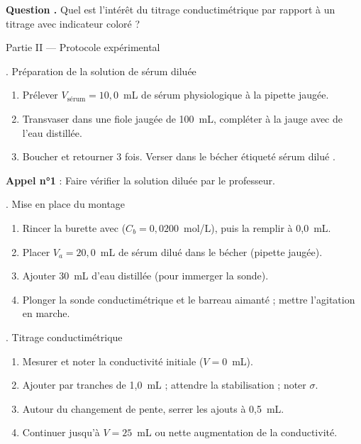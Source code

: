 \documentclass[11pt,a4paper]{article}
\newcommand{\sectitle}[1]{%
  \vspace{6pt}
  \noindent\colorbox{exoheader}{\parbox{\dimexpr\linewidth-2\fboxsep}%
    {\color{white}\bfseries\large\strut\quad #1}}
  \vspace{4pt}
}
\newcommand{\subsectitle}[1]{%
  \vspace{4pt}
  \noindent\colorbox{exolight}{\parbox{\dimexpr\linewidth-2\fboxsep}%
    {\color{exoheader}\bfseries\strut\quad #1}}
  \vspace{2pt}
}
\newcounter{question}
\newcommand{\question}{%
  \stepcounter{question}%
  \noindent\textcolor{exoheader}{\textbf{Question \thequestion.}}\quad
}
\begin{document}
\vspace{0.3cm}\noindent\dotfill

\question Quel est l'intérêt du titrage conductimétrique par rapport à un titrage avec indicateur coloré ? \dotfill

\vspace{0.3cm}\noindent\dotfill

\sectitle{Partie II --- Protocole expérimental}

\subsectitle{1. Préparation de la solution de sérum diluée}

\begin{enumerate}[leftmargin=1.5cm, label=\textcolor{exoheader}{\textbf{\arabic*.}}]
  \item Prélever $V_{\text{sérum}} = 10{,}0$~mL de sérum physiologique à la pipette jaugée.
  \item Transvaser dans une fiole jaugée de 100~mL, compléter à la jauge avec de l'eau distillée.
  \item Boucher et retourner 3 fois. Verser dans le bécher étiqueté \og sérum dilué \fg{}.
\end{enumerate}

\noindent\textcolor{exoheader}{\faCheckSquare\quad \textbf{Appel n°1} : Faire vérifier la solution diluée par le professeur.}

\vspace{4pt}
\subsectitle{2. Mise en place du montage}

\begin{enumerate}[leftmargin=1.5cm, label=\textcolor{exoheader}{\textbf{\arabic*.}}]
  \item Rincer la burette avec  ($C_b = 0{,}0200$~mol/L), puis la remplir à 0,0~mL.
  \item Placer $V_a = 20{,}0$~mL de sérum dilué dans le bécher (pipette jaugée).
  \item Ajouter 30~mL d'eau distillée (pour immerger la sonde).
  \item Plonger la sonde conductimétrique et le barreau aimanté ; mettre l'agitation en marche.
\end{enumerate}

\subsectitle{3. Titrage conductimétrique}

\begin{enumerate}[leftmargin=1.5cm, label=\textcolor{exoheader}{\textbf{\arabic*.}}]
  \item Mesurer et noter la conductivité initiale ($V = 0$~mL).
  \item Ajouter  par tranches de 1,0~mL ; attendre la stabilisation ; noter $\sigma$.
  \item Autour du changement de pente, serrer les ajouts à 0,5~mL.
  \item Continuer jusqu'à $V = 25$~mL ou nette augmentation de la conductivité.
\end{enumerate}
\end{document}

